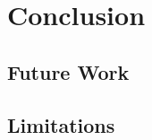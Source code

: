 \chapter{Conclusion}
\label{ch:conclusion}


\section{Future Work}
\label{ch:results-futureWork}


\section{Limitations}
\label{ch:results-limitations}
